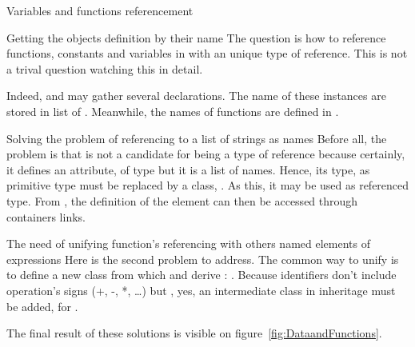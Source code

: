 \documentclass[a4paper]{prjdoc}
\begin{document}
\begin{asection}{Variables and functions referencement}
     \begin{asection}{Getting the objects definition by their name}             
     The question is how to reference functions, constants and variables in  with an unique type of reference.
     This is not a trival question watching this in detail.
        
     Indeed,  and  may gather several declarations. 
     The name of these instances are stored in list of .
     Meanwhile, the names of functions are defined in .
      
        \begin{asection}{Solving the problem of referencing to a list of strings as names}          
        Before all, the problem is that  is not a candidate for being a type of reference because 
        certainly, it defines an attribute,  of type  but it is a list of names. 
        Hence, its type,  as primitive type must be replaced by a class, .
        As this, it  may be used as referenced type. 
        From , the definition of the element can then be accessed through containers links.          
        \end{asection} %
       
        \begin{asection}{The need of unifying function's referencing with others named elements of expressions}          
        Here is the second problem to address. The common way to unify is to define a new class from which 
        and  derive : . Because identifiers don't include operation's signs (+, -, *, \ldots) 
        but , yes, an intermediate class in inheritage must be added,
         for .                    
        \end{asection} %
     
     The final result of these solutions is visible on figure~\ref{fig:DataandFunctions}.
     

\end{asection}
\end{asection}
\end{document}
